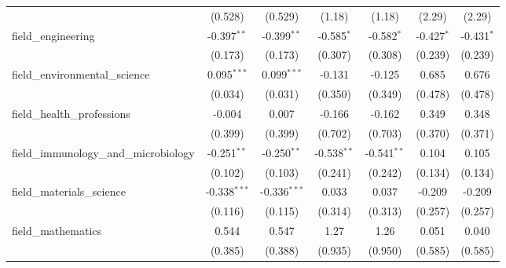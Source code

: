 \begin{tabular}{lcccccc}
                                                               & (0.528)        & (0.529)        & (1.18)         & (1.18)         & (2.29)         & (2.29)\\   
   field\_engineering                                          & -0.397$^{**}$  & -0.399$^{**}$  & -0.585$^{*}$   & -0.582$^{*}$   & -0.427$^{*}$   & -0.431$^{*}$\\   
                                                               & (0.173)        & (0.173)        & (0.307)        & (0.308)        & (0.239)        & (0.239)\\   
   field\_environmental\_science                               & 0.095$^{***}$  & 0.099$^{***}$  & -0.131         & -0.125         & 0.685          & 0.676\\   
                                                               & (0.034)        & (0.031)        & (0.350)        & (0.349)        & (0.478)        & (0.478)\\   
   field\_health\_professions                                  & -0.004         & 0.007          & -0.166         & -0.162         & 0.349          & 0.348\\   
                                                               & (0.399)        & (0.399)        & (0.702)        & (0.703)        & (0.370)        & (0.371)\\   
   field\_immunology\_and\_microbiology                        & -0.251$^{**}$  & -0.250$^{**}$  & -0.538$^{**}$  & -0.541$^{**}$  & 0.104          & 0.105\\   
                                                               & (0.102)        & (0.103)        & (0.241)        & (0.242)        & (0.134)        & (0.134)\\   
   field\_materials\_science                                   & -0.338$^{***}$ & -0.336$^{***}$ & 0.033          & 0.037          & -0.209         & -0.209\\   
                                                               & (0.116)        & (0.115)        & (0.314)        & (0.313)        & (0.257)        & (0.257)\\   
   field\_mathematics                                          & 0.544          & 0.547          & 1.27           & 1.26           & 0.051          & 0.040\\   
                                                               & (0.385)        & (0.388)        & (0.935)        & (0.950)        & (0.585)        & (0.585)\\   

\end{tabular}
